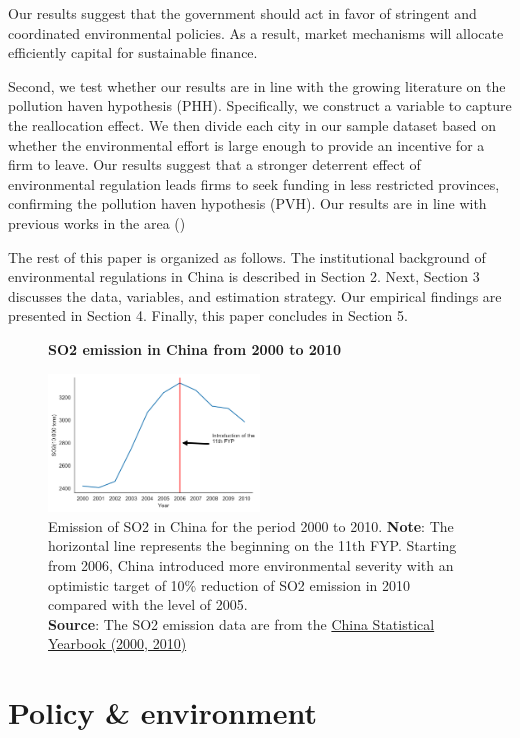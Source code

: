 \documentclass[12pt]{article}
\begin{document}
Our results suggest that the government should act in favor of stringent and coordinated environmental policies. As a result, market mechanisms will allocate efficiently capital for sustainable finance.

Second, we test whether our results are in line with the growing literature on the pollution haven hypothesis (PHH). Specifically, we construct a variable to capture the reallocation effect. We then divide each city in our sample dataset based on whether the environmental effort is large enough to provide an incentive for a firm to leave. Our results suggest that a stronger deterrent effect of environmental regulation leads firms to seek funding in less restricted provinces, confirming the pollution haven hypothesis (PVH). Our results are in line with previous works in the area (\cite{Hering2014-af, Chen2018-ki, Shi2018-zk})

The rest of this paper is organized as follows. The institutional background of environmental regulations in China is described in Section 2. Next, Section 3 discusses the data, variables, and estimation strategy. Our empirical findings are presented in Section 4. Finally, this paper concludes in Section 5.

\begin{figure}[ht]
    \centering
    \textbf{SO2 emission in China from 2000 to 2010}\par\medskip
    \includegraphics[width=0.5\textwidth]{fig_1}
    \caption{Emission of SO2 in China for the period 2000 to 2010. \textbf{Note}: The horizontal line represents the beginning on the 11th FYP. Starting from 2006, China introduced more environmental severity with an optimistic target of 10\% reduction of SO2 emission in 2010 compared with the level of 2005.\\
    \textbf{Source}: The SO2 emission data are from the \href{http://www.stats.gov.cn/english/Statisticaldata/AnnualData/}{China Statistical Yearbook (2000, 2010)}}
    \label{fig:figure1}
\end{figure}


\section{Policy \& environment} \label{sec:Policy}
\end{document}
